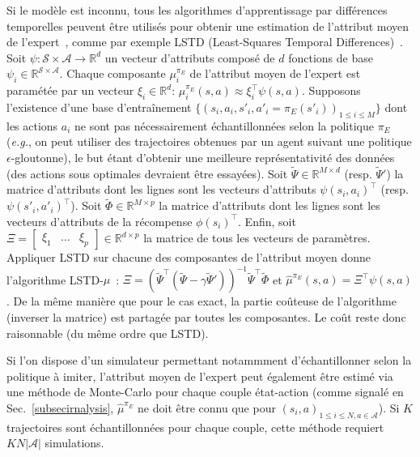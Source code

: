 \documentclass[french,utf8]{./hermes-journal}
\newcommand{\s}{\mathcal{S}}
\newcommand{\A}{\mathcal{A}}
\begin{document}
Si le modèle est inconnu, tous les algorithmes d'apprentissage par différences temporelles peuvent être utilisés pour obtenir une estimation de l'attribut moyen de l'expert~\cite{Klei011}, comme par exemple LSTD (Least-Squares Temporal
Differences)~\cite{Bradtk996}. Soit $\psi:\s\times \A \rightarrow
\mathbb{R}^d$ un vecteur d'attributs composé de $d$ fonctions de base
$\psi_i \in\mathbb{R}^{\s\times \A}$. Chaque composante $\mu_i^{\pi_E}$
 de l'attribut moyen de l'expert est paramétée par un vecteur
$\xi_i\in\mathbb{R}^d$: $\mu_i^{\pi_E}(s,a)\approx \xi_i^\top
\psi(s,a)$. Supposons l'existence d'une base d'entraînement
$\{(s_i,a_i,s'_i,a'_i=\pi_E(s'_i))_{1\leq i \leq M}\}$ dont les actions 
$a_i$ ne sont pas nécessairement échantillonnées selon la politique $\pi_E$
(\textit{e.g.}, on peut utiliser des trajectoires obtenues par un agent suivant une politique $\epsilon$-gloutonne), le but étant d'obtenir une meilleure représentativité des données (des actions sous optimales devraient être essayées). Soit $\tilde{\Psi}\in \mathbb{R}^{M\times d}$
(resp. $\tilde{\Psi}'$) la matrice d'attributs dont les lignes sont les vecteurs d'attributs $\psi(s_i,a_i)^\top$ (resp. $\psi(s'_i,a'_i)^\top$).
Soit $\tilde{\Phi}\in \mathbb{R}^{M\times p}$ la matrice d'attributs dont les lignes sont les vecteurs d'attributs de la récompense $\phi(s_i)^\top$.
Enfin, soit $\Xi =
\begin{bmatrix}   \xi_1 & \dots & \xi_p
\end{bmatrix}\in\mathbb{R}^{d\times p}$ la matrice de tous les vecteurs de paramètres. Appliquer LSTD sur chacune des composantes de l'attribut moyen donne l'algorithme LSTD-$\mu$~\cite{Klei011}: $\Xi =
(\tilde{\Psi}^\top(\tilde{\Psi} - \gamma
\tilde{\Psi}'))^{-1}\tilde{\Psi}^\top \tilde{\Phi}$ et
$\hat{\mu}^{\pi_E}(s,a) = \Xi^\top \psi(s,a)$.
De la même manière que pour le cas exact, la partie coûteuse de l'algorithme (inverser la matrice) est partagée par toutes les composantes. Le coût reste donc raisonnable (du même ordre que LSTD).

%
Si l'on dispose d'un simulateur permettant notammment d'échantillonner selon la politique à imiter, l'attribut moyen de l'expert peut également être estimé via une méthode de Monte-Carlo pour chaque couple état-action (comme signalé en Sec.~\ref{subsecirnalysis}, $\hat{\mu}^{\pi_E}$ ne doit être connu que pour $(s_i,a)_{1\leq i\leq N,a\in\A}$). Si $K$
trajectoires sont échantillonnées pour chaque couple, cette méthode requiert $KN|\A|$ simulations.
\end{document}
